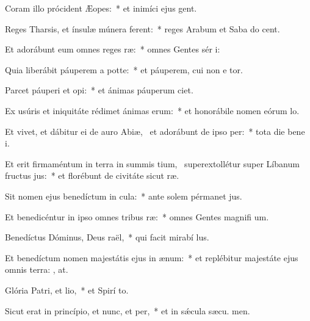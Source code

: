 \item Coram illo prócident Æopes:~* et inimíci ejus  gent.
\item Reges Tharsis, et ínsulæ múnera ferent:~* reges Arabum et Saba do cent.
\item Et adorábunt eum omnes reges ræ:~* omnes Gentes sér i:
\item Quia liberábit páuperem a potte:~* et páuperem, cui non e tor.
\item Parcet páuperi et opi:~* et ánimas páuperum  ciet.
\item Ex usúris et iniquitáte rédimet ánimas erum:~* et honorábile nomen eórum  lo.
\item Et vivet, et dábitur ei de auro Abiæ,~\pscross{} et adorábunt de ipso per:~* tota die bene i.
\item Et erit firmaméntum in terra in summis tium,~\pscross{} superextollétur super Líbanum fructus jus:~* et florébunt de civitáte sicut  ræ.
\item Sit nomen ejus benedíctum in cula:~* ante solem pérmanet  jus.
\item Et benedicéntur in ipso omnes tribus ræ:~* omnes Gentes magnifi um.
\item Benedíctus Dóminus, Deus raël,~* qui facit mirabí lus.
\item Et benedíctum nomen majestátis ejus in ænum:~* et replébitur majestáte ejus omnis terra: , at.
\item Glória Patri, et lio,~* et Spirí to.
\item Sicut erat in princípio, et nunc, et per,~* et in sǽcula sæcu. men.
